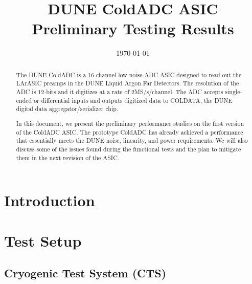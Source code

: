 \documentclass[10pt]{article}
\begin{document}

\title{DUNE ColdADC ASIC Preliminary Testing Results}

\date{\today}


\maketitle



\vspace{1.0in}
\begin{abstract}
The DUNE ColdADC is a 16-channel low-noise ADC ASIC designed to read out the LArASIC preamps in the DUNE Liquid Argon Far Detectors. The resolution of the ADC is 12-bits and it digitizes at a rate of 2MS/s/channel. The ADC accepts single-ended or differential inputs and outputs digitized data to COLDATA, the DUNE digital data aggregator/serializer chip.

In this document, we present the preliminary performance studies on the first version of the ColdADC ASIC. The prototype ColdADC has already achieved a performance that essentially meets the DUNE noise, linearity, and power requirements. We will also discuss some of the issues found during the functional tests and the plan to mitigate them in the next revision of the ASIC.
\end{abstract}


\newpage
\tableofcontents

\newpage

\section{Introduction}




\section{Test Setup}

\subsection{Cryogenic Test System (CTS) }

\end{document}
